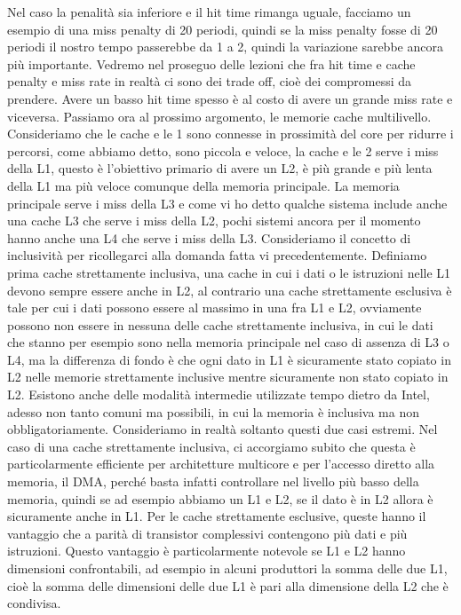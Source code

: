 Nel caso la penalità sia inferiore e il hit time rimanga uguale, facciamo un esempio di una miss penalty di 20 periodi, quindi se la miss penalty fosse di 20 periodi il nostro tempo passerebbe da 1 a 2, quindi la variazione sarebbe ancora più importante.
Vedremo nel proseguo delle lezioni che fra hit time e cache penalty e miss rate in realtà ci sono dei trade off, cioè dei compromessi da prendere.
Avere un basso hit time spesso è al costo di avere un grande miss rate e viceversa.
Passiamo ora al prossimo argomento, le memorie cache multilivello.
Consideriamo che le cache e le 1 sono connesse in prossimità del core per ridurre i percorsi, come abbiamo detto, sono piccola e veloce, la cache e le 2 serve i miss della L1, questo è l'obiettivo primario di avere un L2, è più grande e più lenta della L1 ma più veloce comunque della memoria principale.
La memoria principale serve i miss della L3 e come vi ho detto qualche sistema include anche una cache L3 che serve i miss della L2, pochi sistemi ancora per il momento hanno anche una L4 che serve i miss della L3.
Consideriamo il concetto di inclusività per ricollegarci alla domanda fatta vi precedentemente.
Definiamo prima cache strettamente inclusiva, una cache in cui i dati o le istruzioni nelle L1 devono sempre essere anche in L2, al contrario una cache strettamente esclusiva è tale per cui i dati possono essere al massimo in una fra L1 e L2, ovviamente possono non essere in nessuna delle cache strettamente inclusiva, in cui le dati che stanno per esempio sono nella memoria principale nel caso di assenza di L3 o L4, ma la differenza di fondo è che ogni dato in L1 è sicuramente stato copiato in L2 nelle memorie strettamente inclusive mentre sicuramente non stato copiato in L2.
Esistono anche delle modalità intermedie utilizzate tempo dietro da Intel, adesso non tanto comuni ma possibili, in cui la memoria è inclusiva ma non obbligatoriamente.
Consideriamo in realtà soltanto questi due casi estremi.
Nel caso di una cache strettamente inclusiva, ci accorgiamo subito che questa è particolarmente efficiente per architetture multicore e per l'accesso diretto alla memoria, il DMA, perché basta infatti controllare nel livello più basso della memoria, quindi se ad esempio abbiamo un L1 e L2, se il dato è in L2 allora è sicuramente anche in L1.
Per le cache strettamente esclusive, queste hanno il vantaggio che a parità di transistor complessivi contengono più dati e più istruzioni.
Questo vantaggio è particolarmente notevole se L1 e L2 hanno dimensioni confrontabili, ad esempio in alcuni produttori la somma delle due L1, cioè la somma delle dimensioni delle due L1 è pari alla dimensione della L2 che è condivisa.
